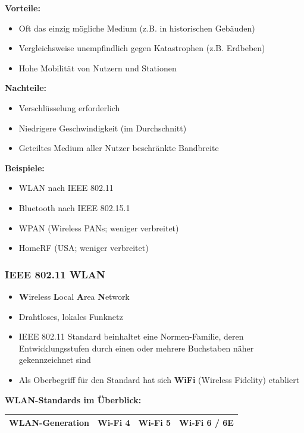 \documentclass[10pt]{article}
\begin{document}
\begin{flushleft}
\textbf{Vorteile:}
\begin{itemize}
    \item Oft das einzig mögliche Medium (z.B. in historischen Gebäuden)
    \item Vergleichsweise unempfindlich gegen Katastrophen (z.B. Erdbeben)
    \item Hohe Mobilität von Nutzern und Stationen
\end{itemize}

\textbf{Nachteile:}
\begin{itemize}
    \item Verschlüsselung erforderlich
    \item Niedrigere Geschwindigkeit (im Durchschnitt)
    \item Geteiltes Medium aller Nutzer \textrightarrow\space beschränkte Bandbreite
\end{itemize}

\textbf{Beispiele:}
\begin{itemize}
    \item WLAN nach IEEE 802.11
    \item Bluetooth nach IEEE 802.15.1
    \item WPAN (Wireless PANs; weniger verbreitet)
    \item HomeRF (USA; weniger verbreitet)
\end{itemize}

\subsubsection{IEEE 802.11 WLAN}

\begin{itemize}
    \item \textbf{W}ireless \textbf{L}ocal \textbf{A}rea \textbf{N}etwork
    \item Drahtloses, lokales Funknetz
    \item IEEE 802.11 Standard beinhaltet eine Normen-Familie, deren Entwicklungsstufen durch einen oder mehrere Buchstaben näher gekennzeichnet sind
    \item Als Oberbegriff für den Standard hat sich \textbf{WiFi} (Wireless Fidelity) etabliert
\end{itemize}

\break

\textbf{WLAN-Standards im Überblick:}
\begin{table}[H]
    \centering
    \begin{tabular}{|p{}||p{}|p{}|p{}|}
    \hline
        \textbf{WLAN-Generation}&\textbf{Wi-Fi 4}&\textbf{Wi-Fi 5}&W\textbf{i-Fi 6 / 6E} \\\hline


\end{tabular}
\end{table}
\end{flushleft}
\end{document}
